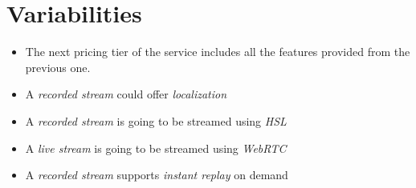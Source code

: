 \section{Variabilities}
\begin{itemize}
    \item The next pricing tier of the service includes all the features 
    provided from the previous one.
    \item A \textit{recorded stream} could offer \textit{localization}
    \item A \textit{recorded stream} is going to be streamed using \textit{HSL}
    \item A \textit{live stream} is going to be streamed using \textit{WebRTC}
    \item A \textit{recorded stream} supports \textit{instant replay} on demand
\end{itemize}